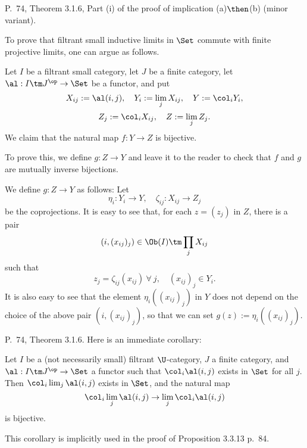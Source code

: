 \documentclass[12pt]{article}
\theoremstyle{remark}
\theoremstyle{definition}
\begin{document}
\begin{s}%

P.~74, Theorem 3.1.6, Part (i) of the proof of implication (a)$\then$(b) (minor variant). 

To prove that filtrant small inductive limits in $\Set$ commute with finite projective limits, one can argue as follows. 

Let $I$ be a filtrant small category, let $J$ be a finite category, let $\al:I\tm J^{\op}\to\Set$ be a functor, and put 
$$
X_{ij}:=\al(i,j),\quad Y_i:=\lim_jX_{ij},\quad Y:=\col_iY_i,
$$
$$
Z_j:=\col_iX_{ij},\quad Z:=\lim_jZ_j.
$$ 
We claim that the natural map $f:Y\to Z$ is bijective. 

To prove this, we define $g:Z\to Y$ and leave it to the reader to check that $f$ and $g$ are mutually inverse bijections. 

We define $g:Z\to Y$ as follows: Let 
$$
\eta_i:Y_i\to Y,\quad\zeta_{ij}:X_{ij}\to Z_j
$$ 
be the coprojections. It is easy to see that, for each $z=(z_j)$ in $Z$, there is a pair 
$$
(i,(x_{ij})_j)\in\Ob(I)\tm\prod_jX_{ij}
$$ 
such that 
$$
z_j=\zeta_{ij}(x_{ij})\ \forall\ j,\quad(x_{ij})_j\in Y_i. 
$$ 
It is also easy to see  that the element $\eta_i((x_{ij})_j)$ in $Y$ does not depend on the choice of the above pair $(i,(x_{ij})_j)$, so that we can set $g(z):=\eta_i((x_{ij})_j)$. 
\end{s}

%

\begin{s} 
P.~74, Theorem 3.1.6. Here is an immediate corollary: 
%
\begin{cor}
Let $I$ be a (not necessarily small) filtrant $\U$-category, $J$ a finite category, and $\al:I\tm J^{\op}\to\Set$ a functor such that $\col_i\al(i,j)$ exists in $\Set$ for all $j$. Then $\col_i\lim_j\al(i,j)$ exists in $\Set$, and the natural map 
$$
\col_i\lim_j\al(i,j)\to
\lim_j\col_i\al(i,j)
$$ 
is bijective. 
\end{cor}
%
This corollary is implicitly used in the proof of Proposition 3.3.13 p.~84.
\end{s}

%
\end{document}
